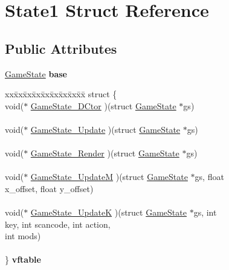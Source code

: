 \hypertarget{struct_state1}{}\section{State1 Struct Reference}
\label{struct_state1}
\subsection*{Public Attributes}
\begin{DoxyCompactItemize}
\item 
\mbox{\label{struct_state1_a65b4825752045d36ea74d5f9db0e7b26}} 
\mbox{\hyperlink{struct_game_state}{Game\+State}} {\bfseries base}
\item 
\mbox{\label{struct_state1_a7f7a1bb11a20a1f4e782c75f8393d523}} 
\begin{tabbing}
xx\=xx\=xx\=xx\=xx\=xx\=xx\=xx\=xx\=\kill
struct \{\\
\>void($\ast$ \mbox{\hyperlink{struct_state1_a89d8206dc3ee03810adff69d2bcce383}{GameState\_DCtor}} )(struct \mbox{\hyperlink{struct_game_state}{GameState}} $\ast$gs)\\
\>\\
\>void($\ast$ \mbox{\hyperlink{struct_state1_a51c43350ef6647802c8b36dfca624ce4}{GameState\_Update}} )(struct \mbox{\hyperlink{struct_game_state}{GameState}} $\ast$gs)\\
\>\\
\>void($\ast$ \mbox{\hyperlink{struct_state1_a37f8f5351b463bde341c3f485fea341e}{GameState\_Render}} )(struct \mbox{\hyperlink{struct_game_state}{GameState}} $\ast$gs)\\
\>\\
\>void($\ast$ \mbox{\hyperlink{struct_state1_a5f49fbaf585c2437b1e6d41cd06e7255}{GameState\_UpdateM}} )(struct \mbox{\hyperlink{struct_game_state}{GameState}} $\ast$gs, float \\
\>\>x\_offset, float y\_offset)\\
\>\\
\>void($\ast$ \mbox{\hyperlink{struct_state1_a89cc02d16a6cc4ec9c908ad4a5176533}{GameState\_UpdateK}} )(struct \mbox{\hyperlink{struct_game_state}{GameState}} $\ast$gs, int \\
\>\>key, int scancode, int action, \\
\>\>int mods)\\
\>\\
\} {\bfseries vftable}\\


\end{tabbing}
\end{DoxyCompactItemize}
